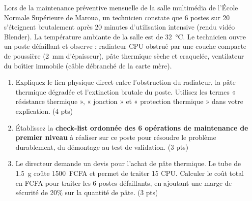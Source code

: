 \documentclass[11pt]{article}
\begin{document}
\begin{exercice}
Lors de la maintenance préventive mensuelle de la salle multimédia de l'École Normale Supérieure de Maroua, un technicien constate que 6 postes sur 20 s'éteignent brutalement après 20 minutes d'utilisation intensive (rendu vidéo Blender). La température ambiante de la salle est de \SI{32}{\celsius}. Le technicien ouvre un poste défaillant et observe : radiateur CPU obstrué par une couche compacte de poussière (\SI{2}{\milli\meter} d'épaisseur), pâte thermique sèche et craquelée, ventilateur du boîtier immobile (câble débranché de la carte mère).

\begin{enumerate}
    \item Expliquez le lien physique direct entre l'obstruction du radiateur, la pâte thermique dégradée et l'extinction brutale du poste. Utilisez les termes « résistance thermique », « jonction » et « protection thermique » dans votre explication. (4 pts)
    \item Établissez la \textbf{check-list ordonnée des 6 opérations de maintenance de premier niveau} à réaliser sur ce poste pour résoudre le problème durablement, du démontage au test de validation. (3 pts)
    \item Le directeur demande un devis pour l'achat de pâte thermique. Le tube de \SI{1,5}{\gram} coûte \SI{1500}{FCFA} et permet de traiter 15 CPU. Calculer le coût total en FCFA pour traiter les 6 postes défaillants, en ajoutant une marge de sécurité de 20\% sur la quantité de pâte. (3 pts)
\end{enumerate}
\end{exercice}
\end{document}
